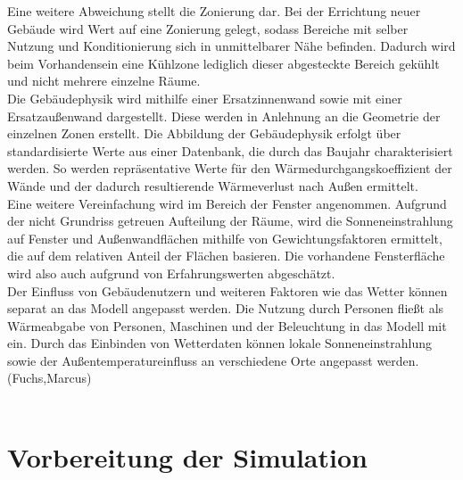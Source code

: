 Eine weitere Abweichung stellt die Zonierung dar. Bei der Errichtung neuer Gebäude wird Wert auf eine Zonierung gelegt, sodass Bereiche mit selber Nutzung und Konditionierung sich in unmittelbarer Nähe befinden. Dadurch wird beim Vorhandensein eine Kühlzone lediglich dieser abgesteckte Bereich gekühlt und nicht mehrere einzelne Räume.\\
Die Gebäudephysik wird mithilfe einer Ersatzinnenwand sowie mit einer Ersatzaußenwand dargestellt. Diese werden in Anlehnung an die Geometrie der einzelnen Zonen erstellt. Die Abbildung der Gebäudephysik erfolgt über standardisierte Werte aus einer Datenbank, die durch das Baujahr charakterisiert werden. So werden repräsentative Werte für den Wärmedurchgangskoeffizient der Wände und der dadurch resultierende Wärmeverlust nach Außen ermittelt.\\
Eine weitere Vereinfachung wird im Bereich der Fenster angenommen. Aufgrund der nicht Grundriss getreuen Aufteilung der Räume, wird die Sonneneinstrahlung auf Fenster und Außenwandflächen mithilfe von Gewichtungsfaktoren ermittelt, die auf dem relativen Anteil der Flächen basieren. Die vorhandene Fensterfläche wird also auch aufgrund von Erfahrungswerten abgeschätzt.\\
Der Einfluss von Gebäudenutzern und weiteren Faktoren wie das Wetter können separat an das Modell angepasst werden. Die Nutzung durch Personen fließt als Wärmeabgabe von Personen, Maschinen und der Beleuchtung in das Modell mit ein. Durch das Einbinden von Wetterdaten können lokale Sonneneinstrahlung sowie der Außentemperatureinfluss an verschiedene Orte angepasst werden. \\
(Fuchs,Marcus)\\
\\
\section{Vorbereitung der Simulation}
\label{sec:Vorbereitung der Simulation}

